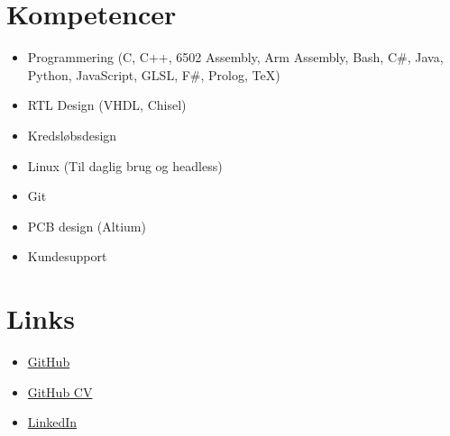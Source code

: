\section{Kompetencer}
	\begin{itemize}
		\item Programmering (C, C++, 6502 Assembly, Arm Assembly, Bash, C\#, Java, Python, JavaScript, GLSL, F\#, Prolog, TeX)
		\item RTL Design (VHDL, Chisel)
		\item Kredsløbsdesign
		\item Linux (Til daglig brug og headless)
		\item Git
		\item PCB design (Altium)
		\item Kundesupport
	\end{itemize}

\section{Links}
	\begin{itemize}
		\item \href{https://github.com/jondalnas}{GitHub}
		\item \href{https://github.com/jondalnas/CV}{GitHub CV}
		\item \href{https://www.linkedin.com/in/jonas-jensen-68a1091b1/}{LinkedIn}
	\end{itemize}
